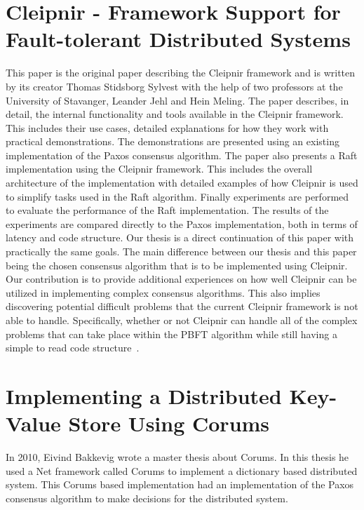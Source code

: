 \section{Cleipnir - Framework Support for Fault-tolerant Distributed Systems}
This paper is the original paper describing the Cleipnir framework and is written by its creator Thomas Stidsborg Sylvest with the help of two professors at the University of Stavanger, Leander Jehl and Hein Meling. The paper describes, in detail, the internal functionality and tools available in the Cleipnir framework. This includes their use cases, detailed explanations for how they work with practical demonstrations. The demonstrations are presented using an existing implementation of the Paxos consensus algorithm. The paper also presents a Raft implementation using the Cleipnir framework. This includes the overall architecture of the implementation with detailed examples of how Cleipnir is used to simplify tasks used in the Raft algorithm. Finally experiments are performed to evaluate the performance of the Raft implementation. The results of the experiments are compared directly to the Paxos implementation, both in terms of latency and code structure. Our thesis is a direct continuation of this paper with practically the same goals. The main difference between our thesis and this paper being the chosen consensus algorithm that is to be implemented using Cleipnir. Our contribution is to provide additional experiences on how well Cleipnir can be utilized in implementing complex consensus algorithms. This also implies discovering potential difficult problems that the current Cleipnir framework is not able to handle. Specifically, whether or not Cleipnir can handle all of the complex problems that can take place within the PBFT algorithm while still having a simple to read code structure~\cite{PAPER:PaxosCleipnir}.
 
\section{Implementing a Distributed Key-Value Store Using Corums}
In 2010, Eivind Bakkevig wrote a master thesis about Corums. In this thesis he used a Net framework called Corums to implement a dictionary based distributed system. This Corums based implementation had an implementation of the Paxos consensus algorithm to make decisions for the distributed system.
 
